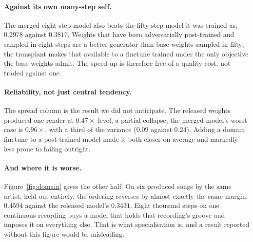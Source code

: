 \documentclass[10pt,twocolumn,letterpaper]{article}
\begin{document}
\paragraph{Against its own many-step self.} The merged eight-step model also
beats the fifty-step model it was trained as, $0.2978$ against $0.3817$. Weights
that have been adversarially post-trained and sampled in eight steps are a better
generator than base weights sampled in fifty; the transplant makes that available
to a finetune trained under the only objective the base weights admit. The
speed-up is therefore free of a quality cost, not traded against one.

\paragraph{Reliability, not just central tendency.} The spread column is the
result we did not anticipate. The released weights produced one render at
$0.47\times$ level, a partial collapse; the merged model's worst case is
$0.96\times$, with a third of the variance ($0.09$ against $0.24$). Adding a
domain finetune to a post-trained model made it both closer on average and
markedly less prone to failing outright.

\paragraph{And where it is worse.} Figure~\ref{fig:domain} gives the other half.
On six produced songs by the same artist, held out entirely, the ordering
reverses by almost exactly the same margin: $0.4594$ against the released model's
$0.3431$. Eight thousand steps on one continuous recording buys a model that
holds that recording's groove and imposes it on everything else. That is what
specialisation is, and a result reported without this figure would be misleading.
\end{document}
